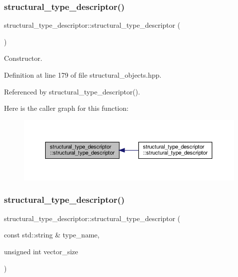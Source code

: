 \subsubsection{\texorpdfstring{structural\+\_\+type\+\_\+descriptor()}{structural\_type\_descriptor()}\hspace{0.1cm}{\footnotesize\ttfamily [1/3]}}
{\footnotesize\ttfamily structural\+\_\+type\+\_\+descriptor\+::structural\+\_\+type\+\_\+descriptor (\begin{DoxyParamCaption}{ }\end{DoxyParamCaption})\hspace{0.3cm}{\ttfamily [inline]}}



Constructor. 



Definition at line 179 of file structural\+\_\+objects.\+hpp.



Referenced by structural\+\_\+type\+\_\+descriptor().

Here is the caller graph for this function\+:
\nopagebreak
\begin{figure}[H]
\begin{center}
\leavevmode
\includegraphics[width=350pt]{dc/da4/structstructural__type__descriptor_a9df10c980d118f27dbfeb8f007b1275a_icgraph}
\end{center}
\end{figure}
\mbox{\label{structstructural__type__descriptor_a337b14675e37bcfe28a67adb43eff4fa}} 
\subsubsection{\texorpdfstring{structural\+\_\+type\+\_\+descriptor()}{structural\_type\_descriptor()}\hspace{0.1cm}{\footnotesize\ttfamily [2/3]}}
{\footnotesize\ttfamily structural\+\_\+type\+\_\+descriptor\+::structural\+\_\+type\+\_\+descriptor (\begin{DoxyParamCaption}\item[{const std\+::string \&}]{type\+\_\+name,  }\item[{unsigned int}]{vector\+\_\+size }\end{DoxyParamCaption})}



